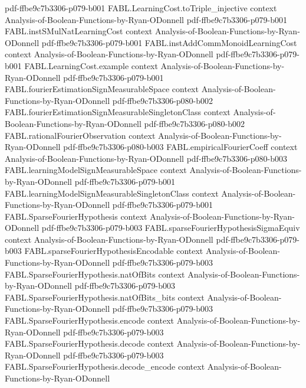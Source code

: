 \begin{theorem}
  {pdf-ffbe9c7b3306-p079-b001}
\proofstep
  {FABL.LearningCost.toTriple_injective}
  {context}
  {Analysis-of-Boolean-Functions-by-Ryan-ODonnell}
  {pdf-ffbe9c7b3306-p079-b001}
\proofstep
  {FABL.instSMulNatLearningCost}
  {context}
  {Analysis-of-Boolean-Functions-by-Ryan-ODonnell}
  {pdf-ffbe9c7b3306-p079-b001}
\proofstep
  {FABL.instAddCommMonoidLearningCost}
  {context}
  {Analysis-of-Boolean-Functions-by-Ryan-ODonnell}
  {pdf-ffbe9c7b3306-p079-b001}
\proofstep
  {FABL.LearningCost.example}
  {context}
  {Analysis-of-Boolean-Functions-by-Ryan-ODonnell}
  {pdf-ffbe9c7b3306-p079-b001}
\proofstep
  {FABL.fourierEstimationSignMeasurableSpace}
  {context}
  {Analysis-of-Boolean-Functions-by-Ryan-ODonnell}
  {pdf-ffbe9c7b3306-p080-b002}
\proofstep
  {FABL.fourierEstimationSignMeasurableSingletonClass}
  {context}
  {Analysis-of-Boolean-Functions-by-Ryan-ODonnell}
  {pdf-ffbe9c7b3306-p080-b002}
\proofstep
  {FABL.rationalFourierObservation}
  {context}
  {Analysis-of-Boolean-Functions-by-Ryan-ODonnell}
  {pdf-ffbe9c7b3306-p080-b003}
\proofstep
  {FABL.empiricalFourierCoeff}
  {context}
  {Analysis-of-Boolean-Functions-by-Ryan-ODonnell}
  {pdf-ffbe9c7b3306-p080-b003}
\proofstep
  {FABL.learningModelSignMeasurableSpace}
  {context}
  {Analysis-of-Boolean-Functions-by-Ryan-ODonnell}
  {pdf-ffbe9c7b3306-p079-b001}
\proofstep
  {FABL.learningModelSignMeasurableSingletonClass}
  {context}
  {Analysis-of-Boolean-Functions-by-Ryan-ODonnell}
  {pdf-ffbe9c7b3306-p079-b001}
\proofstep
  {FABL.SparseFourierHypothesis}
  {context}
  {Analysis-of-Boolean-Functions-by-Ryan-ODonnell}
  {pdf-ffbe9c7b3306-p079-b003}
\proofstep
  {FABL.sparseFourierHypothesisSigmaEquiv}
  {context}
  {Analysis-of-Boolean-Functions-by-Ryan-ODonnell}
  {pdf-ffbe9c7b3306-p079-b003}
\proofstep
  {FABL.sparseFourierHypothesisEncodable}
  {context}
  {Analysis-of-Boolean-Functions-by-Ryan-ODonnell}
  {pdf-ffbe9c7b3306-p079-b003}
\proofstep
  {FABL.SparseFourierHypothesis.natOfBits}
  {context}
  {Analysis-of-Boolean-Functions-by-Ryan-ODonnell}
  {pdf-ffbe9c7b3306-p079-b003}
\proofstep
  {FABL.SparseFourierHypothesis.natOfBits_bits}
  {context}
  {Analysis-of-Boolean-Functions-by-Ryan-ODonnell}
  {pdf-ffbe9c7b3306-p079-b003}
\proofstep
  {FABL.SparseFourierHypothesis.encode}
  {context}
  {Analysis-of-Boolean-Functions-by-Ryan-ODonnell}
  {pdf-ffbe9c7b3306-p079-b003}
\proofstep
  {FABL.SparseFourierHypothesis.decode}
  {context}
  {Analysis-of-Boolean-Functions-by-Ryan-ODonnell}
  {pdf-ffbe9c7b3306-p079-b003}
\proofstep
  {FABL.SparseFourierHypothesis.decode_encode}
  {context}
  {Analysis-of-Boolean-Functions-by-Ryan-ODonnell}

\end{theorem}
